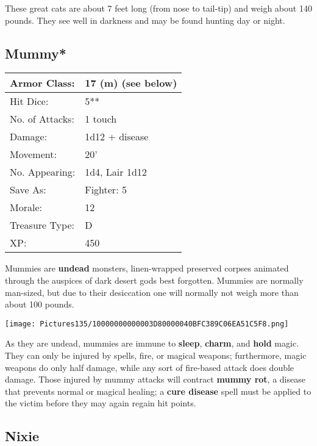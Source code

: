 \documentclass[a4paper,twoside,openany,10pt]{book}
\begin{document}
\begin{multicols}{2}
These great cats are about 7 feet long (from nose to tail-tip) and weigh about 140 pounds. They see well in darkness and may be found hunting day
or night.

\subsection*{Mummy*}\label{mummy}

\begin{tabularx}{0.50\textwidth}{@{}lX@{}} 
Armor Class: & 17 (m) (see below) \\\hline
Hit Dice: & 5** \\\hline
No. of Attacks: & 1 touch \\\hline
Damage: & 1d12 + disease \\\hline
Movement: & 20' \\\hline
No. Appearing: & 1d4, Lair 1d12 \\\hline
Save As: & Fighter: 5 \\\hline
Morale: & 12 \\\hline
Treasure Type: & D \\\hline
XP: & 450 \\\hline
\end{tabularx}\medskip

Mummies are \textbf{undead} monsters, linen-wrapped preserved corpses animated through the auspices of dark desert gods best forgotten. Mummies are normally man-sized, but due to their desiccation one will normally not weigh more than about 100 pounds.


\begin{center} \texttt{[image: Pictures135/10000000000003D80000040BFC389C06EA51C5F8.png]} \end{center}

As they are undead, mummies are immune to \textbf{sleep}, \textbf{charm}, and \textbf{hold} magic. They can only be injured by spells, fire, or magical weapons; furthermore, magic weapons do only half damage, while any sort of fire-based attack does double damage. Those injured by mummy attacks will contract \textbf{mummy rot}, a disease that prevents normal or magical healing; a \textbf{cure disease }spell must be applied to the victim before they may again regain hit points.

\subsection*{Nixie}\label{nixie}


\end{multicols}
\end{document}
